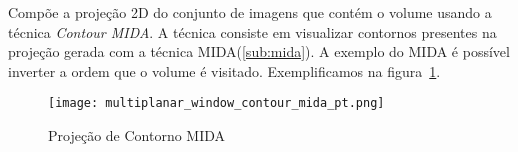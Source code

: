 Compõe a projeção 2D do conjunto de imagens que contém o volume usando a técnica \textit{Contour MIDA}. A técnica consiste em visualizar contornos presentes na projeção gerada com a técnica MIDA(\ref{sub:mida}). A exemplo do MIDA é possível inverter a ordem que o volume é visitado. Exemplificamos na figura~\ref{fig:proj_contorno_mida}.

\begin{figure}[H]
\centering
\texttt{[image: multiplanar\_window\_contour\_mida\_pt.png]}
\caption{Projeção de Contorno MIDA}
\label{fig:proj_contorno_mida}
\end{figure}